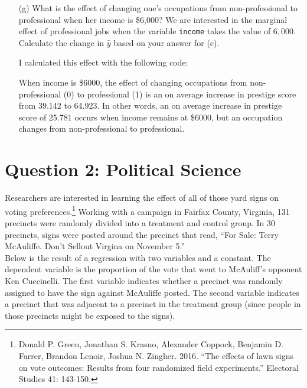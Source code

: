 \documentclass[12pt,letterpaper]{article}
\begin{document}
\begin{enumerate}
	
	\item [(g)]
	What is the effect of changing one's occupations from non-professional to professional when her income is \$6,000? We are interested in the marginal effect of professional jobs when the variable \texttt{income} takes the value of $6,000$. Calculate the change in $\hat{y}$ based on your answer for (c).
	
	I calculated this effect with the following code:
	
	
	
	When income is \$6000, the effect of changing occupations from non-professional (0) to professional (1) is an on average increase in prestige score from 39.142 to 64.923. In other words, an on average increase in prestige score of 25.781 occurs when income remains at \$6000, but an occupation changes from non-professional to professional.
	
	
\end{enumerate}

\newpage

\section*{Question 2: Political Science}
\vspace{.25cm}
\noindent 	Researchers are interested in learning the effect of all of those yard signs on voting preferences.\footnote{Donald P. Green, Jonathan	S. Krasno, Alexander Coppock, Benjamin D. Farrer,	Brandon Lenoir, Joshua N. Zingher. 2016. ``The effects of lawn signs on vote outcomes: Results from four randomized field experiments.'' Electoral Studies 41: 143-150. } Working with a campaign in Fairfax County, Virginia, 131 precincts were randomly divided into a treatment and control group. In 30 precincts, signs were posted around the precinct that read, ``For Sale: Terry McAuliffe. Don't Sellout Virgina on November 5.'' \\

Below is the result of a regression with two variables and a constant.  The dependent variable is the proportion of the vote that went to McAuliff's opponent Ken Cuccinelli. The first variable indicates whether a precinct was randomly assigned to have the sign against McAuliffe posted. The second variable indicates
a precinct that was adjacent to a precinct in the treatment group (since people in those precincts might be exposed to the signs).  \\
\end{document}

